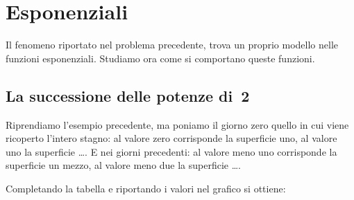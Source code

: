 \section{Esponenziali}
\label{sec:esplog_esponenziali}

Il fenomeno riportato nel problema precedente, trova un proprio modello nelle 
funzioni esponenziali. Studiamo ora come si comportano queste funzioni.

\subsection{La successione delle potenze di~2}
\label{subsec:esplog_succpotdue}

Riprendiamo l'esempio precedente, ma poniamo il giorno zero quello in cui viene 
ricoperto l'intero stagno: al valore zero corrisponde la superficie uno, al 
valore uno la superficie \dots. E nei giorni precedenti: al valore meno uno 
corrisponde la superficie un mezzo, al valore meno due la superficie \dots.

Completando la tabella e riportando i valori nel grafico si ottiene:

